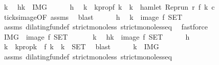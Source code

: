 \begin{isabellebody}
\ k\ \isamarkupfalse%
\ h{\isacharcolon}{\isacartoucheopen}k\ {\isasymin}\ {\isacharquery}IMG{\isacartoucheclose}\isanewline
\ \ \ \ \isamarkupfalse%
\ h\ \isamarkupfalse%
\ k\ \ k{}prop{\isacharcolon}{\isacartoucheopen}f\ k\ {\isacharequal}\ k\ {\isasymand}\ hamlet\ {\isacharparenleft}{\isacharparenleft}Rep{\isacharunderscore}run\ r{\isacharparenright}\ {\isacharparenleft}f\ k\ c{\isacharparenright}{\isacartoucheclose}\isanewline
\ \ \ \ \ \ \isamarkupfalse%
\ ticks{\isacharunderscore}image{\isacharbrackleft}OF\ assms{\isacharbrackright}\ \isamarkupfalse%
\ blast\isanewline
\ \ \ \ \isamarkupfalse%
\ h\ \isamarkupfalse%
\ {\isacartoucheopen}k\ {\isasymin}\ image\ f\ {\isacharquery}SET{\isacartoucheclose}\isanewline
\ \ \ \ \ \ \isamarkupfalse%
\ assms\ dilating{\isacharunderscore}fun{\isacharunderscore}def\ strict{\isacharunderscore}mono{\isacharunderscore}less\ strict{\isacharunderscore}mono{\isacharunderscore}less{\isacharunderscore}eq\ \isamarkupfalse%
\ fastforce\isanewline
\ \ \isacommand{{\isacharbraceright}}\isamarkupfalse%
\ \isamarkupfalse%
\ {\isacartoucheopen}{\isacharquery}IMG\ {\isasymsubseteq}\ image\ f\ {\isacharquery}SET{\isacartoucheclose}\ \isacommand{{\isachardot}{\isachardot}}\isamarkupfalse%
\isanewline
{}\isamarkupfalse%
\isanewline
\ \ \isacommand{{\isacharbraceleft}}\isamarkupfalse%
\ \isamarkupfalse%
\ k\ \isamarkupfalse%
\ h{\isacharcolon}{\isacartoucheopen}k\ {\isasymin}\ image\ f\ {\isacharquery}SET{\isacartoucheclose}\isanewline
\ \ \ \ \isamarkupfalse%
\ h\ \isamarkupfalse%
\ k\ \ k{}prop{\isacharcolon}{\isacartoucheopen}k\ {\isacharequal}\ f\ k\ {\isasymand}\ k\ {\isasymin}\ {\isacharquery}SET{\isacartoucheclose}\ \isamarkupfalse%
\ blast\isanewline
\ \ \ \ \isamarkupfalse%
\ {\isacartoucheopen}k\ {\isasymin}\ {\isacharquery}IMG{\isacartoucheclose}\isanewline
\ \ \ \ \ \ \isamarkupfalse%
\ assms\ dilating{\isacharunderscore}fun{\isacharunderscore}def\ strict{\isacharunderscore}mono{\isacharunderscore}less\ strict{\isacharunderscore}mono{\isacharunderscore}less{\isacharunderscore}eq\ \isamarkupfalse%

\end{isabellebody}
